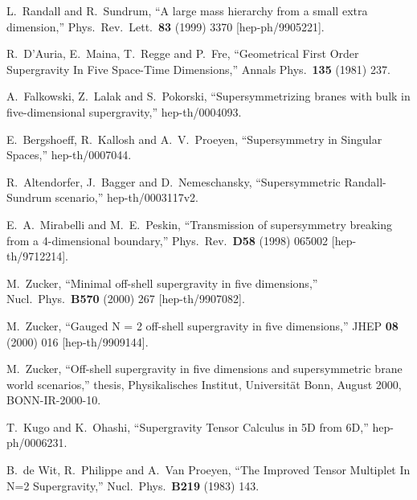 \documentclass[a4paper,12pt, twoside]{article}
\numberwithin{equation}{section}
\begin{document}
\begin{thebibliography}{99}



L.~Randall and R.~Sundrum,
``A large mass hierarchy from a small extra dimension,''
Phys.\ Rev.\ Lett.\  {\bf 83} (1999) 3370
[hep-ph/9905221].


R.~D'Auria, E.~Maina, T.~Regge and P.~Fre,
``Geometrical First Order Supergravity In Five Space-Time Dimensions,''
Annals Phys.\  {\bf 135} (1981) 237.


A.~Falkowski, Z.~Lalak and S.~Pokorski,
``Supersymmetrizing branes with bulk in five-dimensional 
supergravity,''
hep-th/0004093.


E.~Bergshoeff, R.~Kallosh and A.~V.~Proeyen,
``Supersymmetry in Singular Spaces,''
hep-th/0007044.



R.~Altendorfer, J.~Bagger and D.~Nemeschansky,
``Supersymmetric Randall-Sundrum scenario,''
hep-th/0003117v2.


E.~A.~Mirabelli and M.~E.~Peskin,
``Transmission of supersymmetry breaking from a 4-dimensional 
boundary,''
Phys.\ Rev.\  {\bf D58} (1998) 065002
[hep-th/9712214].


M.~Zucker,
``Minimal off-shell supergravity in five dimensions,''
Nucl.\ Phys.\  {\bf B570} (2000) 267
[hep-th/9907082].


M.~Zucker,
``Gauged N = 2 off-shell supergravity in five dimensions,''
JHEP {\bf 08} (2000) 016
[hep-th/9909144].


M.~Zucker,
``Off-shell supergravity in five dimensions and supersymmetric brane 
world scenarios,''
thesis, Physikalisches Institut, Universit\"at Bonn, August 2000, 
BONN-IR-2000-10.


T.~Kugo and K.~Ohashi,
``Supergravity Tensor Calculus in 5D from 6D,''
hep-ph/0006231.


B.~de Wit, R.~Philippe and A.~Van Proeyen,
``The Improved Tensor Multiplet In N=2 Supergravity,''
Nucl.\ Phys.\  {\bf B219} (1983) 143.



\end{thebibliography}
\end{document}
